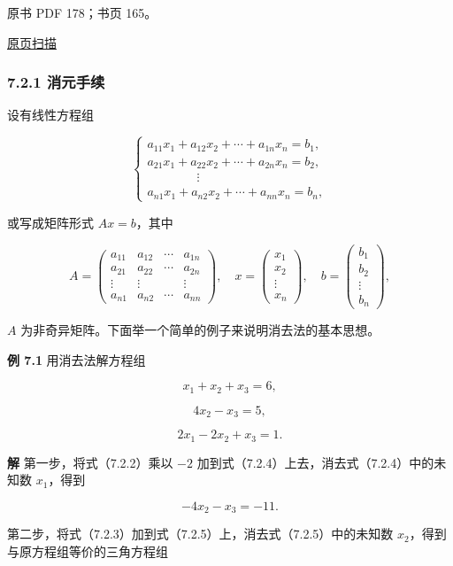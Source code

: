 \documentclass[
  10pt,
  fontset=fandol]{ctexart}
\begin{document}
\clearpage

原书 PDF 178；书页 165。

\href{../../../source-images/pdf-178.jpeg}{原页扫描}

\subsubsection{7.2.1 消元手续}\label{ux6d88ux5143ux624bux7eed}

设有线性方程组

\[
\begin{cases}
a_{11}x_1+a_{12}x_2+\cdots+a_{1n}x_n=b_1,\\
a_{21}x_1+a_{22}x_2+\cdots+a_{2n}x_n=b_2,\\
\qquad\qquad\vdots\\
a_{n1}x_1+a_{n2}x_2+\cdots+a_{nn}x_n=b_n,
\end{cases}
\tag{7.2.1}
\]

或写成矩阵形式 \(Ax=b\)，其中

\[
A=\begin{pmatrix}
a_{11}&a_{12}&\cdots&a_{1n}\\
a_{21}&a_{22}&\cdots&a_{2n}\\
\vdots&\vdots&&\vdots\\
a_{n1}&a_{n2}&\cdots&a_{nn}
\end{pmatrix},\quad
x=\begin{pmatrix}x_1\\x_2\\\vdots\\x_n\end{pmatrix},\quad
b=\begin{pmatrix}b_1\\b_2\\\vdots\\b_n\end{pmatrix},
\]

\(A\) 为非奇异矩阵。下面举一个简单的例子来说明消去法的基本思想。

\textbf{例 7.1} 用消去法解方程组

\[x_1+x_2+x_3=6,\tag{7.2.2}\]

\[4x_2-x_3=5,\tag{7.2.3}\]

\[2x_1-2x_2+x_3=1.\tag{7.2.4}\]

\textbf{解} 第一步，将式（7.2.2）乘以 \(-2\) 加到式（7.2.4）上去，消去式（7.2.4）中的未知数 \(x_1\)，得到

\[-4x_2-x_3=-11.\tag{7.2.5}\]

第二步，将式（7.2.3）加到式（7.2.5）上，消去式（7.2.5）中的未知数 \(x_2\)，得到与原方程组等价的三角方程组
\end{document}
